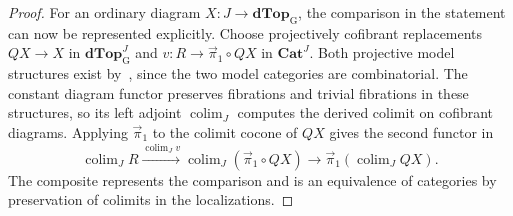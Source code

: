 \documentclass[12pt,a4paper]{amsart}
\theoremstyle{definition}
\renewcommand{\vec}{\overrightarrow}
\newcommand{\D}{\mathbf{dTop}}
\newcommand{\Cat}{\mathbf{Cat}}
\newcommand{\MG}{\D_{\mathrm G}}
\newcommand{\PiC}{\vec{\pi}_1}
\begin{document}
\begin{proof}
For an ordinary diagram $X\colon J\to\MG$, the comparison in the statement can now be represented explicitly. Choose projectively cofibrant replacements $QX\to X$ in $\MG^J$ and $v\colon R\to\PiC\circ QX$ in $\Cat^J$. Both projective model structures exist by~\cite[Proposition~A.2.8.2]{Lurie2009}, since the two model categories are combinatorial. The constant diagram functor preserves fibrations and trivial fibrations in these structures, so its left adjoint $\operatorname{colim}_J$ computes the derived colimit on cofibrant diagrams. Applying $\PiC$ to the colimit cocone of $QX$ gives the second functor in
\[
 \operatorname{colim}_J R\xrightarrow{\operatorname{colim}_J v}\operatorname{colim}_J(\PiC\circ QX)
 \longrightarrow\PiC\!\left(\operatorname{colim}_J QX\right).
\]
The composite represents the comparison and is an equivalence of categories by preservation of colimits in the localizations.
\end{proof}
\end{document}

